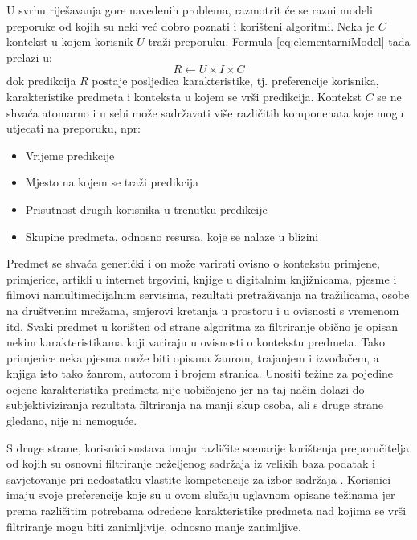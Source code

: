 \documentclass[times, utf8, diplomski, numeric]{fer}
\begin{document}
U svrhu riješavanja gore navedenih problema, razmotrit će se razni modeli
preporuke od kojih su neki već dobro poznati i korišteni algoritmi. Neka je $C$
kontekst u kojem korisnik $U$ traži preporuku. Formula \ref{eq:elementarniModel}
tada prelazi u:
\begin{equation}
\label{eq:elementarniModelSKontekstom}
	R \leftarrow U \times I \times C
\end{equation}
dok predikcija $R$ postaje posljedica karakteristike, tj. preferencije
korisnika, karakteristike predmeta i konteksta u kojem se vrši predikcija.
Kontekst $C$ se ne shvaća atomarno i u sebi može sadržavati više različitih
komponenata koje mogu utjecati na preporuku, npr:
\begin{itemize}
  \item Vrijeme predikcije
  \item Mjesto na kojem se traži predikcija
  \item Prisutnost drugih korisnika u trenutku predikcije
  \item Skupine predmeta, odnosno resursa, koje se nalaze u blizini
\end{itemize}

Predmet se shvaća generički i on može varirati ovisno o kontekstu primjene,
primjerice, artikli u internet trgovini, knjige u digitalnim knjižnicama, pjesme
i filmovi namultimedijalnim servisima, rezultati pretraživanja na tražilicama,
osobe na društvenim mrežama, smjerovi kretanja u prostoru i u ovisnosti s
vremenom itd. Svaki predmet u korišten od strane algoritma za filtriranje obično
je opisan nekim karakteristikama koji variraju u ovisnosti o kontekstu predmeta.
Tako primjerice neka pjesma može biti opisana žanrom, trajanjem i izvođačem, a
knjiga isto tako žanrom, autorom i brojem stranica. Unositi težine za pojedine
ocjene karakteristika predmeta nije uobičajeno jer na taj način dolazi do
subjektiviziranja rezultata filtriranja na manji skup osoba, ali s druge strane
gledano, nije ni nemoguće.

S druge strane, korisnici sustava imaju različite scenarije korištenja
preporučitelja od kojih su osnovni filtriranje neželjenog sadržaja iz velikih
baza podatak i savjetovanje pri nedostatku vlastite kompetencije za izbor
sadržaja \cite{AskIda}. Korisnici imaju svoje preferencije koje su u ovom
slučaju uglavnom opisane težinama jer prema različitim potrebama određene
karakteristike predmeta nad kojima se vrši filtriranje mogu biti zanimljivije,
odnosno manje zanimljive.
\end{document}
